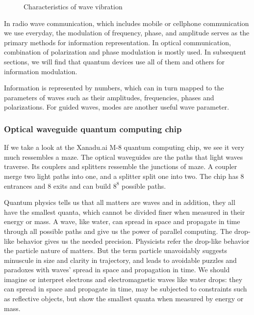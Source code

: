 \begin{figure}[ht]
\caption{Characteristics of wave vibration}
\label{wave}
\end{figure}

In radio wave communication, which includes mobile or cellphone communication we use everyday, the modulation of frequency, phase, and amplitude serves as the primary methods for information representation. In optical communication, combination of polarization and phase modulation is mostly used. In subsequent sections, we will find that quantum devices use all of them and others for information modulation.

Information is represented by numbers, which can in turn mapped to the parameters of waves such as their amplitudes, frequencies, phases and polarizations. For guided waves, modes are another useful wave parameter.

\subsubsection{Optical waveguide quantum computing chip}
If we take a look at the Xanadu.ai M-8 quantum computing chip, we see it very much ressembles a maze. The optical waveguides are the paths that light waves traverse. Its couplers and splitters ressemble the junctions of maze. A coupler merge two light paths into one, and a splitter split one into two. The chip has 8 entrances and 8 exits and can build $8^8$ possible paths.

Quantum physics tells us that all matters are waves and in addition, they all have the smallest quanta, which cannot be divided finer when measured in their energy or mass. A wave, like water, can spread in space and propagate in time through all possible paths and give us the power of parallel computing. The drop-like behavior gives us the needed precision. Physicists refer the drop-like behavior the particle nature of matters. But the term particle unavoidably suggests minuscule in size and clarity in trajectory, and leads to avoidable puzzles and paradoxes with waves' spread in space and propagation in time. We should imagine or interpret electrons and electromagnetic waves like water drops: they can spread in space and propagate in time, may be subjected to constraints such as reflective objects, but show the smallest quanta when measured by energy or mass.

